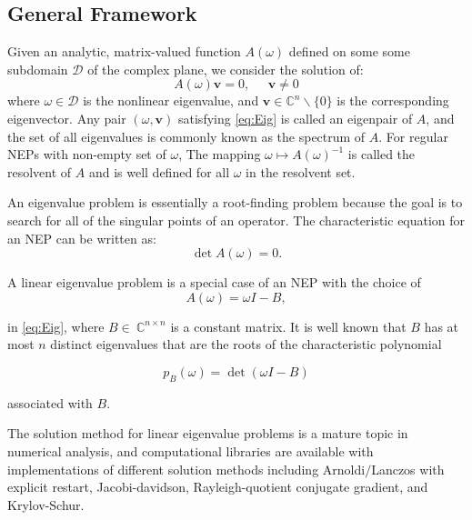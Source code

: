 \documentclass[11pt,letterpaper]{article}
\begin{document}
\subsection{General Framework}
Given an analytic, matrix-valued function $A(\omega)$ defined on some some subdomain $\mathcal{D}$ of the complex plane, we consider the solution of:
\begin{equation}\label{eq:Eig}
    A(\omega) \mathbf{v} = 0,\;\;\;\;\;\mathbf{v}\neq 0
\end{equation}
where $\omega \in \mathcal{D}$ is the nonlinear eigenvalue, and $\mathbf{v} \in \mathbb{C}^n\backslash\{0\}$ is the corresponding eigenvector. Any pair $(\omega, \mathbf{v})$ satisfying \ref{eq:Eig} is called an eigenpair of $A$, and the set of all eigenvalues is commonly known as the spectrum of $A$. For regular NEPs with non-empty set of $\omega$, The mapping $\omega \mapsto A(\omega)^{-1}$ is called the resolvent of $A$ and is well defined for all $\omega$ in the resolvent set. 

\pagebreak
An eigenvalue problem is essentially a root-finding problem because the goal is to search for all of the singular points of an operator. The characteristic equation for an NEP can be written as:
\begin{equation}\label{eq:charNEP}
\det A(\omega) = 0. 
\end{equation}

A linear eigenvalue problem is a special case of an NEP with the choice of 
\begin{equation} 
\label{eq:LEP}
A(\omega )= \omega I - B,
\end{equation}

in \ref{eq:Eig}, where $B \in\ \mathbb{C}^{n \times n}$ is a constant matrix. It is well known that $B$ has at most $n$ distinct eigenvalues that are the roots of the characteristic polynomial

\begin{equation}
	\label{eq:charEP}
	p_{B}(\omega)=\det(\omega I -B)
\end{equation}  

associated with $B$. 

The solution method for linear eigenvalue problems is a mature topic in numerical analysis, and computational libraries are available with implementations of different solution methods including Arnoldi$/$Lanczos with explicit restart, Jacobi-davidson, Rayleigh-quotient conjugate gradient, and Krylov-Schur.  \citep{hernandez2005slepc} 
\end{document}
